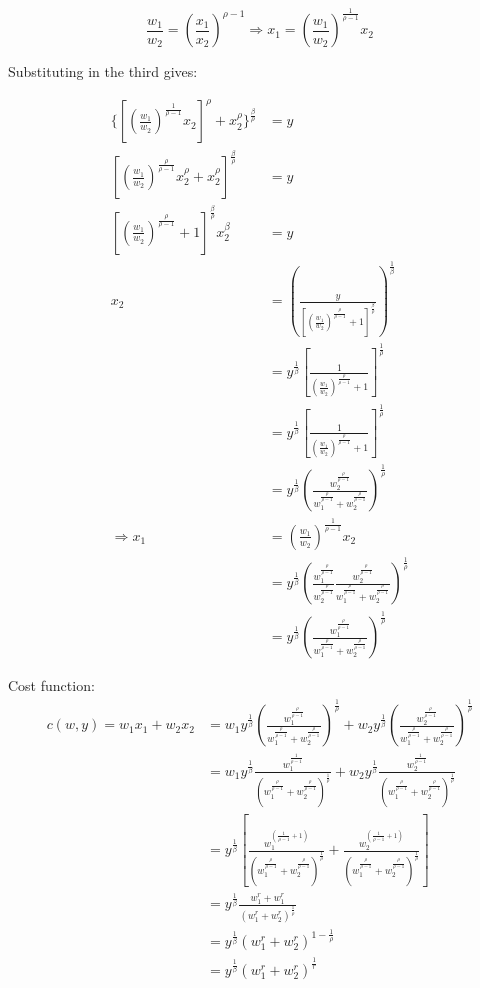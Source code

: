 \documentclass{article}
\begin{document}
$$\frac{w_1}{w_2}= (\frac{x_1}{x_2})^{\rho - 1} \Rightarrow x_1 = (\frac{w_1}{w_2})^{\frac{1}{\rho - 1}} x_2$$

Substituting in the third gives:

\begin{align*}
\{[(\frac{w_1}{w_2})^{\frac{1}{\rho - 1}} x_2]^\rho + x_2^\rho\}^{\frac{\beta}{\rho}} &=y \\
[(\frac{w_1}{w_2})^{\frac{\rho}{\rho - 1}} x_2^\rho + x_2^\rho]^{\frac{\beta}{\rho}} &=y \\
[(\frac{w_1}{w_2})^{\frac{\rho}{\rho - 1}} + 1]^{\frac{\beta}{\rho}} x_2^\beta &=y \\
x_2 &= (\frac{y}{[(\frac{w_1}{w_2})^{\frac{\rho}{\rho - 1}} + 1]^{\frac{\beta}{\rho}} })^{\frac{1}{\beta}} \\
 &= y^{\frac{1}{\beta}} [\frac{1}{(\frac{w_1}{w_2})^{\frac{\rho}{\rho - 1}} + 1}]^{\frac{1}{\rho}} \\
&= y^{\frac{1}{\beta}} [\frac{1}{(\frac{w_1}{w_2})^{\frac{\rho}{\rho - 1}} + 1}]^{\frac{1}{\rho}} \\
&= y^{\frac{1}{\beta}} (\frac{w_2^{\frac{\rho}{\rho - 1}}}{w_1^{\frac{\rho}{\rho - 1}} + w_2^{\frac{\rho}{\rho - 1}}})^{\frac{1}{\rho}} \\
\Rightarrow x_1 &= (\frac{w_1}{w_2})^{\frac{1}{\rho - 1}} x_2  \\
&= y^{\frac{1}{\beta}} (\frac{w_1^{\frac{\rho}{\rho - 1}}   }{w_2^{\frac{\rho}{\rho - 1}}   } \frac{w_2^{\frac{\rho}{\rho - 1}}}{w_1^{\frac{\rho}{\rho - 1}} + w_2^{\frac{\rho}{\rho - 1}}})^{\frac{1}{\rho}}  \\
&=y^{\frac{1}{\beta}} (\frac{w_1^{\frac{\rho}{\rho - 1}}}{w_1^{\frac{\rho}{\rho - 1}} + w_2^{\frac{\rho}{\rho - 1}}})^{\frac{1}{\rho}} 
\end{align*}

Cost function: 
\begin{align*}
c(w,y) = w_1x_1 + w_2x_2 &= w_1y^{\frac{1}{\beta}} (\frac{w_1^{\frac{\rho}{\rho - 1}}}{w_1^{\frac{\rho}{\rho - 1}} + w_2^{\frac{\rho}{\rho - 1}}})^{\frac{1}{\rho}}  +w_2 y^{\frac{1}{\beta}} (\frac{w_2^{\frac{\rho}{\rho - 1}}}{w_1^{\frac{\rho}{\rho - 1}} + w_2^{\frac{\rho}{\rho - 1}}})^{\frac{1}{\rho}} \\
&= w_1y^{\frac{1}{\beta}} \frac{w_1^{\frac{1}{\rho - 1}}}{(w_1^{\frac{\rho}{\rho - 1}} + w_2^{\frac{\rho}{\rho - 1}})^{\frac{1}{\rho}}}  +w_2 y^{\frac{1}{\beta}} \frac{w_2^{\frac{1}{\rho - 1}}}{(w_1^{\frac{\rho}{\rho - 1}} + w_2^{\frac{\rho}{\rho - 1}})^{\frac{1}{\rho}}} \\
&=y^{\frac{1}{\beta}} [\frac{w_1^{(\frac{1}{\rho - 1}+1)}}{(w_1^{\frac{\rho}{\rho - 1}} + w_2^{\frac{\rho}{\rho - 1}})^{\frac{1}{\rho}}} + \frac{w_2^{(\frac{1}{\rho - 1}+1)}}{(w_1^{\frac{\rho}{\rho - 1}} + w_2^{\frac{\rho}{\rho - 1}})^{\frac{1}{\rho}}}] \\
&=y^{\frac{1}{\beta}}\frac{w_1^r+w_1^r}{(w_1^r + w_2^r)^{\frac{1}{\rho}}} \\
&=y^{\frac{1}{\beta}}{(w_1^r + w_2^r)^{1 - \frac{1}{\rho}}} \\
&=y^{\frac{1}{\beta}}{(w_1^r + w_2^r)^{\frac{1}{r}}} \\
\end{align*}
\end{document}
